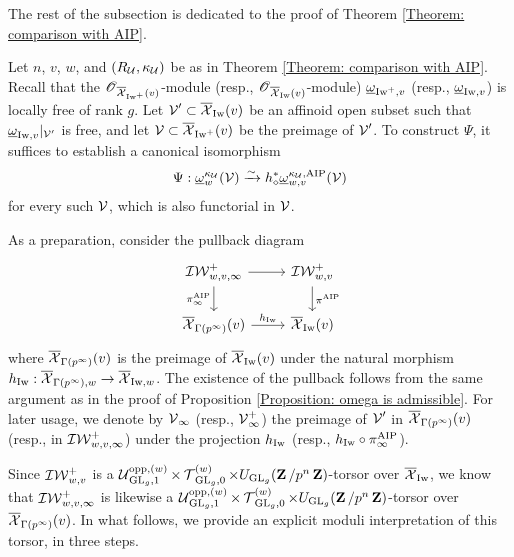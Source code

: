 The rest of the subsection is dedicated to the proof of Theorem \ref{Theorem: comparison with AIP}. 

Let $n$, $v$, $w$, and $(R_{\calU}, \kappa_{\calU})$ be as in Theorem \ref{Theorem: comparison with AIP}. Recall that the $\scrO_{\overline{\calX}_{\Iw^+}(v)}$-module (resp., $\scrO_{\overline{\calX}_{\Iw}(v)}$-module) $\underline{\omega}_{\Iw^+, v}$ (resp., $\underline{\omega}_{\Iw, v}$) is locally free of rank $g$. Let $\calV' \subset \overline{\calX}_{\Iw}(v)$ be an affinoid open subset such that $\underline{\omega}_{\Iw, v}|_{\calV'}$ is free, and let $\calV \subset \overline{\calX}_{\Iw^+}(v)$ be the preimage of $\calV'$. To construct $\Psi$, it suffices to establish a canonical isomorphism
$$\Psi:\underline{\omega}_w^{\kappa_{\calU}}(\calV)\xrightarrow{\sim} h_{\diamond}^*\underline{\omega}_{w, v}^{\kappa_{\calU}, \AIP}(\calV)$$
for every such $\calV$, which is also functorial in $\calV$.

As a preparation, consider the pullback diagram \[
    \begin{tikzcd}
        \adicIW_{w,v, \infty}^+ \arrow[r]\arrow[d, "\pi_{\infty}^{\AIP}"'] & \adicIW_{w,v}^+\arrow[d, "\pi^{\AIP}"]\\
        \overline{\calX}_{\Gamma(p^{\infty})}(v) \arrow[r, "h_{\Iw}"] & \overline{\calX}_{\Iw}(v)
    \end{tikzcd}
\] where $\overline{\calX}_{\Gamma(p^{\infty})}(v)$ is the preimage of $\overline{\calX}_{\Iw}(v)$ under the natural morphism $h_{\Iw}: \overline{\calX}_{\Gamma(p^{\infty}), w} \rightarrow \overline{\calX}_{\Iw, w}$. The existence of the pullback follows from the same argument as in the proof of Proposition \ref{Proposition: omega is admissible}. For later usage, we denote by $\calV_{\infty}$ (resp., $\calV^+_{\infty}$) the preimage of $\calV'$ in $\overline{\calX}_{\Gamma(p^{\infty})}(v)$ (resp., in $\adicIW_{w,v, \infty}^+$) under the projection $h_{\Iw}$ (resp., $h_{\Iw}\circ \pi_{\infty}^{\AIP}$).

Since $\adicIW_{w,v}^+$ is a $\calU_{\GL_g, 1}^{\opp, (w)}\times \calT_{\GL_g,0}^{(w)}\times U_{\GL_g}(\Z/p^n\Z)$-torsor over $\overline{\calX}_{\Iw}$, we know that $\adicIW_{w,v, \infty}^+$ is likewise a $\calU_{\GL_g, 1}^{\opp, (w)}\times \calT_{\GL_g,0}^{(w)}\times U_{\GL_g}(\Z/p^n\Z)$-torsor over $\overline{\calX}_{\Gamma(p^{\infty})}(v)$. In what follows, we provide an explicit moduli interpretation of this torsor, in three steps.

